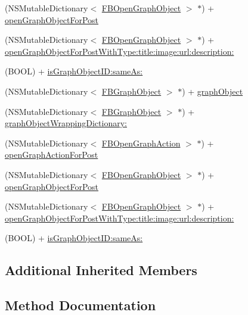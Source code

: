 \begin{DoxyCompactItemize}
\item 
(N\+S\+Mutable\+Dictionary$<$ \hyperlink{protocolFBOpenGraphObject-p}{F\+B\+Open\+Graph\+Object} $>$ $\ast$) + \hyperlink{interfaceFBGraphObject_a79fab85a97be10dc0d5bf6febcc848f4}{open\+Graph\+Object\+For\+Post}
\item 
(N\+S\+Mutable\+Dictionary$<$ \hyperlink{protocolFBOpenGraphObject-p}{F\+B\+Open\+Graph\+Object} $>$ $\ast$) + \hyperlink{interfaceFBGraphObject_ad8c6af9938313eafd419342903a15f25}{open\+Graph\+Object\+For\+Post\+With\+Type\+:title\+:image\+:url\+:description\+:}
\item 
(B\+O\+OL) + \hyperlink{interfaceFBGraphObject_a62b9fd3318de27294b10860c9a62160c}{is\+Graph\+Object\+I\+D\+:same\+As\+:}
\item 
(N\+S\+Mutable\+Dictionary$<$ \hyperlink{interfaceFBGraphObject}{F\+B\+Graph\+Object} $>$ $\ast$) + \hyperlink{interfaceFBGraphObject_af260be1d9411288632bf883f84838853}{graph\+Object}
\item 
(N\+S\+Mutable\+Dictionary$<$ \hyperlink{interfaceFBGraphObject}{F\+B\+Graph\+Object} $>$ $\ast$) + \hyperlink{interfaceFBGraphObject_af840ca586bf7b7ecf55d97c0e780f2cd}{graph\+Object\+Wrapping\+Dictionary\+:}
\item 
(N\+S\+Mutable\+Dictionary$<$ \hyperlink{protocolFBOpenGraphAction-p}{F\+B\+Open\+Graph\+Action} $>$ $\ast$) + \hyperlink{interfaceFBGraphObject_a88f02cdbd7bbafe3c836b9bcd731860d}{open\+Graph\+Action\+For\+Post}
\item 
(N\+S\+Mutable\+Dictionary$<$ \hyperlink{protocolFBOpenGraphObject-p}{F\+B\+Open\+Graph\+Object} $>$ $\ast$) + \hyperlink{interfaceFBGraphObject_a79fab85a97be10dc0d5bf6febcc848f4}{open\+Graph\+Object\+For\+Post}
\item 
(N\+S\+Mutable\+Dictionary$<$ \hyperlink{protocolFBOpenGraphObject-p}{F\+B\+Open\+Graph\+Object} $>$ $\ast$) + \hyperlink{interfaceFBGraphObject_ad8c6af9938313eafd419342903a15f25}{open\+Graph\+Object\+For\+Post\+With\+Type\+:title\+:image\+:url\+:description\+:}
\item 
(B\+O\+OL) + \hyperlink{interfaceFBGraphObject_a62b9fd3318de27294b10860c9a62160c}{is\+Graph\+Object\+I\+D\+:same\+As\+:}
\end{DoxyCompactItemize}
\subsection*{Additional Inherited Members}


\subsection{Method Documentation}
\mbox{\label{interfaceFBGraphObject_af260be1d9411288632bf883f84838853}} 

